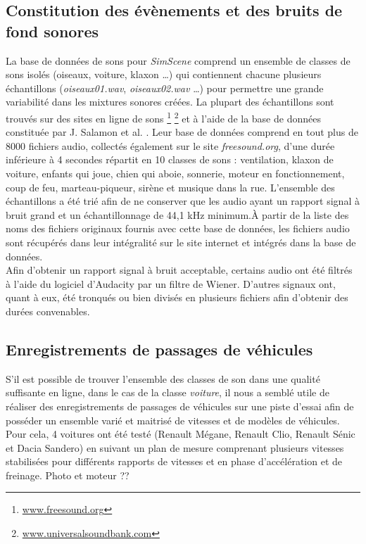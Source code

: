 \subsection{Constitution des évènements et des bruits de fond sonores}

La base de données de sons pour \textit{SimScene} comprend un ensemble de classes de sons isolés (oiseaux, voiture, klaxon  \dots) qui contiennent chacune plusieurs échantillons (\textit{oiseaux01.wav}, \textit{oiseaux02.wav} \dots) pour permettre une grande variabilité dans les mixtures sonores créées. La plupart des échantillons sont trouvés sur des sites en ligne de sons \footnote{\url{www.freesound.org}} \footnote{\url{www.universalsoundbank.com}} et à l'aide de la base de données constituée par J. Salamon et al. \cite{salamon_dataset_nodate}. Leur base de données comprend en tout plus de 8000 fichiers audio, collectés également sur le site \textit{freesound.org}, d'une durée inférieure à 4 secondes répartit en 10 classes de sons : ventilation, klaxon de voiture, enfants qui joue, chien qui aboie, sonnerie, moteur en fonctionnement, coup de feu, marteau-piqueur, sirène et musique dans la rue. L'ensemble des échantillons a été trié afin de ne conserver que les audio ayant un rapport signal à bruit grand et un échantillonnage de 44,1 kHz minimum.\`A partir de la liste des noms des fichiers originaux fournis avec cette base de données, les fichiers audio sont récupérés dans leur intégralité sur le site internet et intégrés dans la base de données.\\
Afin d'obtenir un rapport signal à bruit acceptable, certains audio ont été filtrés à l'aide du logiciel d'Audacity par un filtre de Wiener. D'autres signaux ont, quant à eux, été tronqués ou bien divisés en plusieurs fichiers afin d'obtenir des durées convenables. 
 
\subsection{Enregistrements de passages de véhicules}
S'il est possible de trouver l'ensemble des classes de son dans une qualité suffisante en ligne, dans le cas de la classe \textit{voiture}, il nous a semblé utile de réaliser des enregistrements de passages de véhicules sur une piste d'essai afin de posséder un ensemble varié et maitrisé de vitesses et de modèles de véhicules. Pour cela, 4 voitures ont été testé (Renault Mégane, Renault Clio, Renault Sénic et Dacia Sandero) en suivant un plan de mesure comprenant plusieurs vitesses stabilisées pour différents rapports de vitesses et en phase d'accélération et de freinage.
Photo et moteur ??

